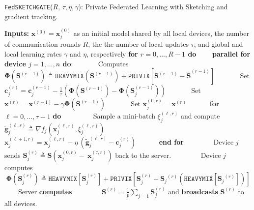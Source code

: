 
\begin{algorithm}[H]
\caption{\texttt{FedSKETCHGATE}($R$, $\tau, \eta, \gamma$): Private Federated Learning with Sketching and gradient tracking. }\label{Alg:PFLHet}
\begin{algorithmic}[1]
\State \textbf{Inputs:} $\boldsymbol{x}^{(0)}=\boldsymbol{x}^{(0)}_j$ as an initial  model shared by all local devices, the number of communication rounds $R$, the the number of local updates $\tau$, and global and local learning rates $\gamma$ and $\eta$, respectively
\State \textbf{for $r=0, \ldots, R-1$ do}
\State $\qquad$\textbf{parallel for device $j=1,\ldots,n$ do}:
\State $\qquad\quad$ Computes ${\mathbf{\Phi}}(\mathbf{S}^{(r-1)})\triangleq \texttt{HEAVYMIX}(\mathbf{S}^{(r-1)})+\texttt{PRIVIX}\left[{\mathbf{S}}^{(r-1)}- \tilde{\mathbf{S}}^{(r-1)}\right]$
\State $\qquad\quad$ Set $\mathbf{c}_j^{(r)}=\mathbf{c}_j^{(r-1)}-\frac{1}{\tau}\left(\mathbf{\Phi}\left(\mathbf{S}^{(r-1)}\right)-\mathbf{\Phi}\left(\mathbf{S}^{(r-1)}_{j}\right)\right)$
\State $\qquad\quad$ Set $\boldsymbol{x}^{(r)}=\boldsymbol{x}^{(r-1)}-\gamma\mathbf{\Phi}\left(\mathbf{S}^{(r-1)}\right)$
\State $\qquad\quad$ Set $\boldsymbol{x}_j^{(0,r)}=\boldsymbol{x}^{(r)}$ %
\State $\qquad\quad $\textbf{for} $\ell=0,\ldots,\tau-1$ \textbf{do}
\State $\qquad\quad\quad$ Sample a mini-batch $\xi_j^{(\ell,r)}$ and compute $\tilde{\mathbf{g}}_{j}^{(\ell,r)}\triangleq\nabla{f}_j(\boldsymbol{x}^{(\ell,r)}_j,\xi_j^{(\ell,r)})$
\State $\qquad\quad\quad$ $\boldsymbol{x}^{(\ell+1,r)}_{j}=\boldsymbol{x}^{(\ell,r)}_j-\eta~\left( \tilde{\mathbf{g}}_{j}^{(\ell,r)}-\mathbf{c}_j^{(r)}\right)$ \label{eq:update-rule-alg}
\State $\qquad\quad$\textbf{end for}
\State $\qquad\quad\quad$Device $j$ sends $\mathbf{S}^{(r)}_{j}\triangleq\mathbf{S}\left(\boldsymbol{x}_j^{(0,r)}-~{\boldsymbol{x}}_{j}^{(\tau,r)}\right)$ back to the server.
\State $\qquad\quad\quad$Device $j$ computes $$\mathbf{\Phi}\left(\mathbf{S}^{(r)}_{j}\right)\triangleq \texttt{HEAVYMIX}[\mathbf{S}_j^{(r)}]+\texttt{PRIVIX}\left[{\mathbf{S}}_j^{(r)}- {\mathbf{S}_j}^{(r)}\left(\texttt{HEAVYMIX}[{\mathbf{S}_j}^{(r)}]\right)\right]$$
\State $\qquad$Server \textbf{computes} 
\State $\qquad\qquad {\mathbf{S}}^{(r)}=\frac{1}{p}\sum_{j=1}\mathbf{S}^{(r)}_{j}$ and  \textbf{broadcasts} ${\mathbf{S}}^{(r)}$ to all devices.

\end{algorithmic}
\end{algorithm}
